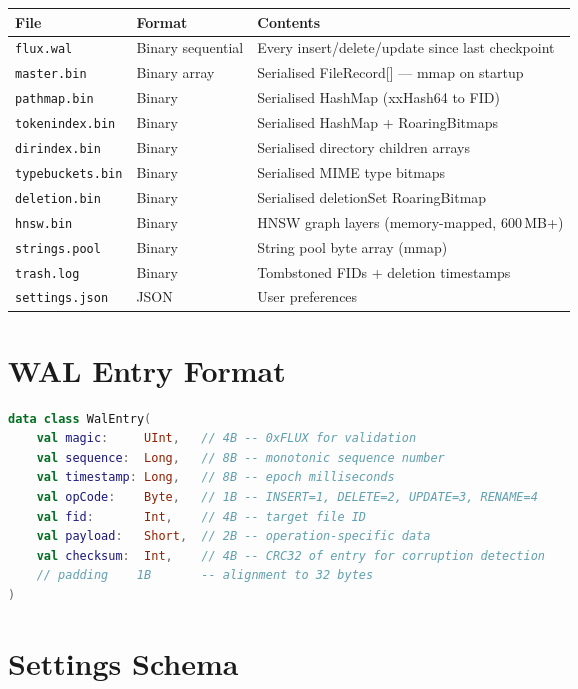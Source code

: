 \begin{longtable}{@{}p{42mm}p{28mm}p{68mm}@{}}
\toprule
\textbf{File} & \textbf{Format} & \textbf{Contents} \\
\midrule
\texttt{flux.wal} & Binary sequential & Every insert/delete/update since last checkpoint \\
\texttt{master.bin} & Binary array & Serialised FileRecord[] --- mmap on startup \\
\texttt{pathmap.bin} & Binary & Serialised HashMap (xxHash64 to FID) \\
\texttt{tokenindex.bin} & Binary & Serialised HashMap + RoaringBitmaps \\
\texttt{dirindex.bin} & Binary & Serialised directory children arrays \\
\texttt{typebuckets.bin} & Binary & Serialised MIME type bitmaps \\
\texttt{deletion.bin} & Binary & Serialised deletionSet RoaringBitmap \\
\texttt{hnsw.bin} & Binary & HNSW graph layers (memory-mapped, 600\,MB+) \\
\texttt{strings.pool} & Binary & String pool byte array (mmap) \\
\texttt{trash.log} & Binary & Tombstoned FIDs + deletion timestamps \\
\texttt{settings.json} & JSON & User preferences \\
\bottomrule
\end{longtable}

\section{WAL Entry Format}

\begin{lstlisting}[language=Kotlin, caption=WAL Entry -- 32 bytes]
data class WalEntry(
    val magic:     UInt,   // 4B -- 0xFLUX for validation
    val sequence:  Long,   // 8B -- monotonic sequence number
    val timestamp: Long,   // 8B -- epoch milliseconds
    val opCode:    Byte,   // 1B -- INSERT=1, DELETE=2, UPDATE=3, RENAME=4
    val fid:       Int,    // 4B -- target file ID
    val payload:   Short,  // 2B -- operation-specific data
    val checksum:  Int,    // 4B -- CRC32 of entry for corruption detection
    // padding    1B       -- alignment to 32 bytes
)
\end{lstlisting}

\section{Settings Schema}

